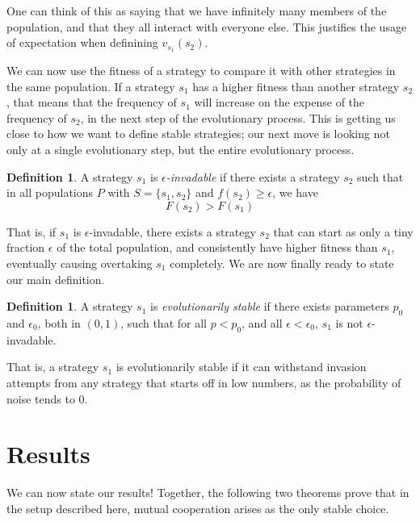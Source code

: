 \documentclass[11pt]{amsart}
\theoremstyle{definition}
\newtheorem{definition}[theorem]{Definition}
\theoremstyle{remark}
\begin{document}
One can think of this as saying that we have infinitely many members of the population, and that they all interact with everyone else. This justifies the usage of expectation when definining $v_{s_1}(s_2)$.

We can now use the fitness of a strategy to compare it with other strategies in the same population. If a strategy $s_1$ has a higher fitness than another strategy $s_2$, that means that the frequency of $s_1$ will increase on the expense of the frequency of $s_2$, in the next step of the evolutionary process. This is getting us close to how we want to define stable strategies; our next move is looking not only at a single evolutionary step, but the entire evolutionary process.

\begin{definition}
  A strategy $s_1$ is \textit{$\epsilon$-invadable} if there exists a strategy $s_2$ such that in all populations $P$ with $S = \{s_1,s_2\}$ and $f(s_2) \geq \epsilon$, we have 
  \begin{equation*}
    \label{fitnesscond}
    F(s_2) > F(s_1)
  \end{equation*}
\end{definition}

That is, if $s_1$ is $\epsilon$-invadable, there exists a strategy $s_2$ that can start as only a tiny fraction $\epsilon$ of the total population, and consistently have higher fitness than $s_1$, eventually causing overtaking $s_1$ completely. We are now finally ready to state our main definition.

\begin{definition}
  A strategy $s_1$ is \textit{evolutionarily stable} if there exists parameters $p_0$ and $\epsilon_0$, both in $(0,1)$, such that for all $p < p_0$, and all $\epsilon < \epsilon_0$, $s_1$ is not $\epsilon$-invadable.
\end{definition}

That is, a strategy $s_1$ is evolutionarily stable if it can withstand invasion attempts from any strategy that starts off in low numbers, as the probability of noise tends to 0. 

\section{Results}

We can now state our results! Together, the following two theorems prove that in the setup described here, mutual cooperation arises as the only stable choice.
\end{document}
